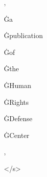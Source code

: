 \documentclass[varwidth]{standalone}
\begin{document}
\begin{CJK*}{UTF8}{gbsn}
{{{\colorbox{red!0.28870478}{\strut ,} \colorbox{red!0.26695585}{\strut Ġa} \colorbox{red!0.34893584}{\strut Ġpublication} \colorbox{red!0.1302076}{\strut Ġof} \colorbox{red!0.26170737}{\strut Ġthe} \colorbox{red!0.26647165}{\strut ĠHuman} \colorbox{red!0.39347076}{\strut ĠRights} \colorbox{red!0.40598187}{\strut ĠDefense} \colorbox{red!0.74313605}{\strut ĠCenter} \colorbox{red!0.36873344}{\strut ,} \colorbox{red!0.6869393}{\strut </s>} 
}}}
\end{CJK*}
\end{document}
